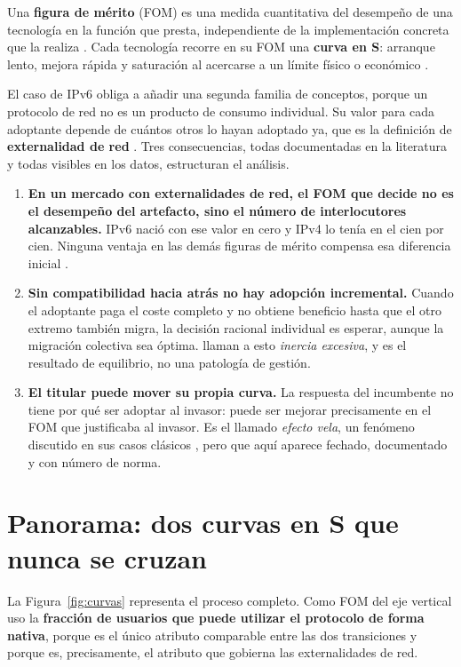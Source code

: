 \documentclass[11pt,letterpaper]{article}
\begin{document}
Una \textbf{figura de mérito} (FOM) es una medida cuantitativa del desempeño de
una tecnología en la función que presta, independiente de la implementación
concreta que la realiza \parencite{deweck2022}. Cada tecnología recorre en su FOM
una \textbf{curva en S}: arranque lento, mejora rápida y saturación al acercarse
a un límite físico o económico \parencite{foster1986,utterback1994}.

El caso de IPv6 obliga a añadir una segunda familia de conceptos, porque un
protocolo de red no es un producto de consumo individual. Su valor para cada
adoptante depende de cuántos otros lo hayan adoptado ya, que es la definición de
\textbf{externalidad de red} \parencite{katz1985}. Tres consecuencias, todas
documentadas en la literatura y todas visibles en los datos, estructuran el
análisis.

\begin{enumerate}
  \item \textbf{En un mercado con externalidades de red, el FOM que decide no es
    el desempeño del artefacto, sino el número de interlocutores alcanzables.}
    IPv6 nació con ese valor en cero y IPv4 lo tenía en el cien por cien. Ninguna
    ventaja en las demás figuras de mérito compensa esa diferencia inicial
    \parencite{arthur1989,david1985}.
  \item \textbf{Sin compatibilidad hacia atrás no hay adopción incremental.}
    Cuando el adoptante paga el coste completo y no obtiene beneficio hasta que
    el otro extremo también migra, la decisión racional individual es esperar,
    aunque la migración colectiva sea óptima. \textcite{farrell1985} llaman a
    esto \emph{inercia excesiva}, y es el resultado de equilibrio, no una
    patología de gestión.
  \item \textbf{El titular puede mover su propia curva.} La respuesta del
    incumbente no tiene por qué ser adoptar al invasor: puede ser mejorar
    precisamente en el FOM que justificaba al invasor. Es el llamado
    \emph{efecto vela}, un fenómeno discutido en sus casos clásicos
    \parencite{howells2002,mendonca2013}, pero que aquí aparece fechado,
    documentado y con número de norma.
\end{enumerate}

\section{Panorama: dos curvas en S que nunca se cruzan}

La Figura~\ref{fig:curvas} representa el proceso completo. Como FOM del eje
vertical uso la \textbf{fracción de usuarios que puede utilizar el protocolo de
forma nativa}, porque es el único atributo comparable entre las dos transiciones
y porque es, precisamente, el atributo que gobierna las externalidades de red.
\end{document}
